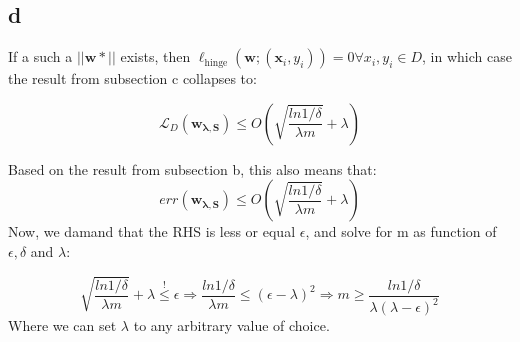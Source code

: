 \subsection*{d}
If a such a $||\boldsymbol{w*}||$ exists, then $\ell_{\text{hinge}}(\boldsymbol{w};(\boldsymbol{x}_i, y_i)) = 0 \forall x_i, y_i \in D$, in which case the result from subsection c collapses to:

\begin{equation*}
    \mathcal{L}_D(\boldsymbol{w_{\lambda, S}}) \leq O\left(\sqrt{\frac{ln 1/\delta}{\lambda m}} + \lambda \right)
\end{equation*}

Based on the result from subsection b, this also means that:
\begin{equation*}
    err(\boldsymbol{w_{\lambda, S}}) \leq O\left(\sqrt{\frac{ln 1/\delta}{\lambda m}} + \lambda \right)
\end{equation*}
Now, we damand that the RHS is less or equal $\epsilon$, and solve for m as function of $\epsilon, \delta$ and $\lambda$:

\begin{equation*}
    \sqrt{\frac{ln 1/\delta}{\lambda m}} + \lambda \overset{!}{\leq} \epsilon 
    \Rightarrow \frac{ln 1/\delta}{\lambda m} \leq (\epsilon-\lambda)^2
    \Rightarrow m \geq \frac{ln 1/\delta}{\lambda(\lambda-\epsilon)^2}
\end{equation*}
Where we can set $\lambda$ to any arbitrary value of choice.
